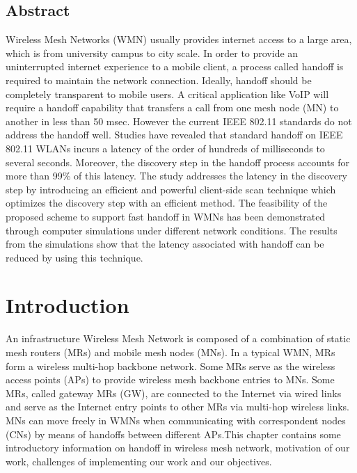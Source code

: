 \documentclass[12pt,a4paper]{report}
\begin{document}
\begin{center}

\section*{Abstract}
\justify
Wireless Mesh Networks (WMN) usually provides internet access to a large area, which is from university campus to city scale. In order to provide an uninterrupted internet experience to a mobile client, a process called handoff is required to maintain the network connection. Ideally, handoff should be completely transparent to mobile users. A critical application like VoIP will require a handoff capability that transfers a call from one mesh node (MN) to another in less than 50 msec. However the current IEEE 802.11 standards do not address the handoff well. Studies have revealed that standard handoff on IEEE 802.11 WLANs incurs a latency of the order of hundreds of milliseconds to several seconds. Moreover, the discovery step in the handoff process accounts for more than 99\% of this latency. The study addresses the latency in the discovery step by introducing an efficient and powerful client-side scan technique which optimizes the discovery step with an efficient method. The feasibility of the proposed scheme to support fast handoff in WMNs has been demonstrated through computer simulations under different network conditions. The results from the simulations show that the latency associated with handoff can be reduced by using this technique.

\end{center}
\tableofcontents
\listoffigures
\chapter{Introduction}
An infrastructure Wireless Mesh Network is composed of a combination of static mesh routers (MRs) and mobile mesh nodes (MNs). In a typical WMN, MRs form a wireless multi-hop backbone network. Some MRs serve as the wireless access points (APs) to provide wireless mesh backbone entries to MNs. Some MRs, called gateway MRs (GW), are connected to the Internet via wired links and serve as the Internet entry points to other MRs via multi-hop wireless links. MNs can move freely in WMNs when communicating with correspondent nodes (CNs) by means of handoffs between different APs.This chapter contains some introductory information on handoff in wireless mesh network, motivation of our work, challenges of implementing our work and our objectives.
\end{document}
